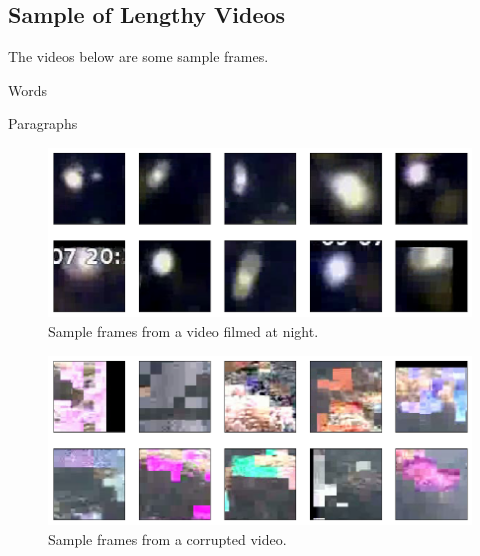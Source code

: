 \documentclass[bsc,logo,twoside,fullspacing,parskip]{infthesis}
\begin{document}
\begin{appendices}
\chapter{Sample of Lengthy Videos}
\label{sec:samplelong}
The videos below are some sample frames.

Words

Paragraphs

\begin{figure}
\centering
    \includegraphics[scale=0.46]{graph/sample_night.png}
    \caption{Sample frames from a video filmed at night.}
    \label{fig:sample_night}
\end{figure}

\begin{figure}
\centering
    \includegraphics[scale=0.46]{graph/sample_corrupt.png}
    \caption{Sample frames from a corrupted video.}
    \label{fig:sample_corrupt}
\end{figure}


\end{appendices}
\end{document}
